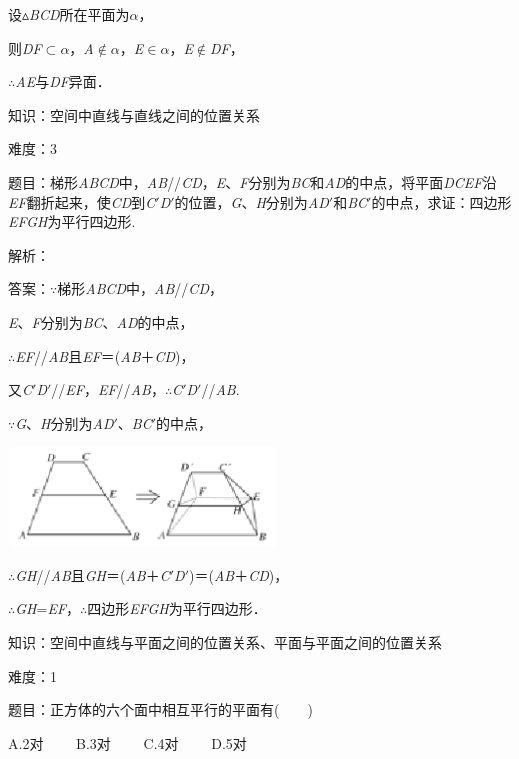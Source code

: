 \documentclass{article} %
\begin{document}
设$\mathrm{\vartriangle}$\textit{BCD}所在平面为\textit{$\alpha$}，

则\textit{DF}$\mathrm{\subset }$\textit{$\alpha$}，\textit{A}$\mathrm{\notin}$\textit{$\alpha$}，\textit{E}$\mathrm{\in}$\textit{$\alpha$}，\textit{E}$\mathrm{\notin}$\textit{DF}，

$\mathrm{\therefore}$\textit{AE}与\textit{DF}异面．

知识：空间中直线与直线之间的位置关系

难度：3

题目：梯形\textit{ABCD}中，\textit{AB}//\textit{CD}，\textit{E}、\textit{F}分别为\textit{BC}和\textit{AD}的中点，将平面\textit{DCEF}沿\textit{EF}翻折起来，使\textit{CD}到\textit{C}$'$\textit{D}$'$的位置，\textit{G}、\textit{H}分别为\textit{AD}$'$和\textit{BC}$'$的中点，求证：四边形\textit{EFGH}为平行四边形.


解析：

答案：$\mathrm{\because}$梯形\textit{ABCD}中，\textit{AB}//\textit{CD}，

\textit{E}、\textit{F}分别为\textit{BC}、\textit{AD}的中点，

$\mathrm{\therefore}$\textit{EF}//\textit{AB}且\textit{EF}＝(\textit{AB}＋\textit{CD})，

又\textit{C}$'$\textit{D}$'$//\textit{EF}，\textit{EF}//\textit{AB}，$\mathrm{\therefore}$\textit{C}$'$\textit{D}$'$//\textit{AB}.

$\mathrm{\because}$\textit{G}、\textit{H}分别为\textit{AD}$'$、\textit{BC}$'$的中点，

\includegraphics*[width=2.83in, height=1.04in, keepaspectratio=false]{image116}

$\mathrm{\therefore}$\textit{GH}//\textit{AB}且\textit{GH}＝(\textit{AB}＋\textit{C}$'$\textit{D}$'$)＝(\textit{AB}＋\textit{CD})，

$\mathrm{\therefore}$\textit{GH}=\textit{EF}，$\mathrm{\therefore}$四边形\textit{EFGH}为平行四边形．

知识：空间中直线与平面之间的位置关系、平面与平面之间的位置关系

难度：1

题目：正方体的六个面中相互平行的平面有(　　)

A.2对　　 B.3对　　 C.4对　　 D.5对
\end{document}
